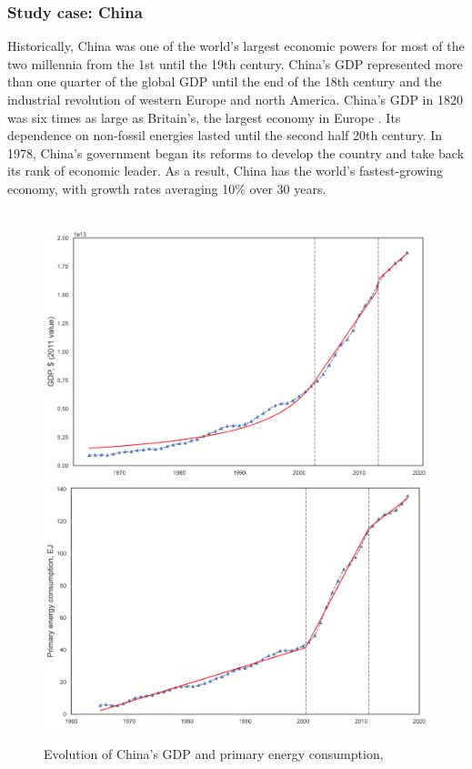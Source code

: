\documentclass[conference]{IEEEtran}
\begin{document}
\subsubsection{Study case: China}
Historically, China was one of the world's largest economic powers for most of the two millennia from the 1st until the 19th century. China’s GDP represented more than one quarter of the global GDP until the end of the 18th century and the industrial revolution of western Europe and north America. China's GDP in 1820 was six times as large as Britain's, the largest economy in Europe \cite{bolt_maddison_2020}. 
Its dependence on non-fossil energies lasted until the second half 20th century.  In 1978, China’s government began its reforms to develop the country and take back its rank of economic leader.  As a result, China has the world's fastest-growing economy, with growth rates averaging 10\% over 30 years. 
\\
\\
\begin{figure}
    \centering
    \includegraphics[scale=0.225]{GDP-time-china.png}
    \includegraphics[scale=0.225]{primary-energy-time-china.png}
    \caption{Evolution of China's GDP and primary energy consumption, \cite{bolt_maddison_2020}\cite{noauthor_statistical_nodate}}
    \label{china}
\end{figure}
\end{document}
